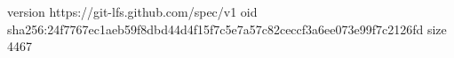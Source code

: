 version https://git-lfs.github.com/spec/v1
oid sha256:24f7767ec1aeb59f8dbd44d4f15f7c5e7a57c82ceccf3a6ee073e99f7c2126fd
size 4467
